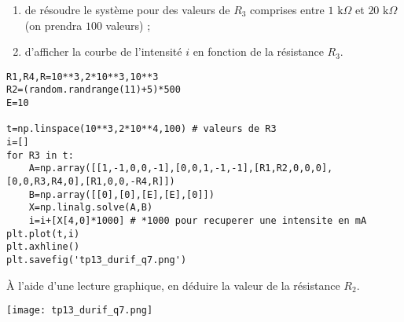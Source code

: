 				\begin{enumerate}
				\item de résoudre le système pour des valeurs de $R_3$ comprises entre $1\text{ k} \Omega$ et $20\text{ k} \Omega$ (on prendra $100$ valeurs) ;
				\item d'afficher la courbe de l'intensité $i$ en fonction de la résistance $R_3$.
				\end{enumerate}
				
\begin{lstlisting}
R1,R4,R=10**3,2*10**3,10**3
R2=(random.randrange(11)+5)*500
E=10

t=np.linspace(10**3,2*10**4,100) # valeurs de R3
i=[]
for R3 in t:
    A=np.array([[1,-1,0,0,-1],[0,0,1,-1,-1],[R1,R2,0,0,0],[0,0,R3,R4,0],[R1,0,0,-R4,R]])
    B=np.array([[0],[0],[E],[E],[0]])
    X=np.linalg.solve(A,B)
    i=i+[X[4,0]*1000] # *1000 pour recuperer une intensite en mA
plt.plot(t,i)
plt.axhline()
plt.savefig('tp13_durif_q7.png')
\end{lstlisting}

\question{} \`{A} l'aide d'une lecture graphique, en déduire la valeur de la résistance $R_2$.

\begin{center}
\texttt{[image: tp13\_durif\_q7.png]}
\end{center}


